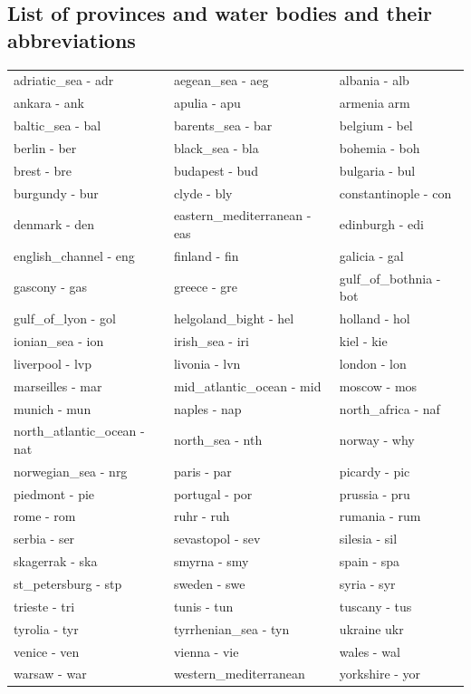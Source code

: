 \documentclass[11pt,a4paper]{report}
\begin{document}
\subsection*{List of provinces and water bodies and their abbreviations}
\begin{tabular}{ l | l | l }
adriatic\_sea - adr & aegean\_sea - aeg & albania - alb \\
ankara - ank & apulia - apu & armenia arm \\
baltic\_sea - bal & barents\_sea - bar & belgium - bel \\
berlin - ber & black\_sea - bla & bohemia - boh \\
brest - bre & budapest - bud & bulgaria - bul \\
burgundy - bur & clyde - bly & constantinople - con \\
denmark - den & eastern\_mediterranean - eas & edinburgh - edi \\
english\_channel - eng & finland - fin & galicia - gal \\
gascony - gas & greece - gre & gulf\_of\_bothnia - bot \\
gulf\_of\_lyon - gol & helgoland\_bight - hel & holland - hol \\
ionian\_sea - ion & irish\_sea - iri & kiel - kie \\
liverpool - lvp & livonia - lvn & london - lon \\
marseilles - mar & mid\_atlantic\_ocean - mid & moscow - mos \\
munich - mun & naples - nap & north\_africa - naf \\
north\_atlantic\_ocean - nat & north\_sea - nth & norway - why \\
norwegian\_sea - nrg & paris - par & picardy - pic \\
piedmont - pie & portugal - por & prussia - pru \\
rome - rom & ruhr - ruh & rumania - rum \\
serbia - ser & sevastopol - sev & silesia - sil \\
skagerrak - ska & smyrna - smy & spain - spa \\
st\_petersburg - stp & sweden - swe & syria - syr \\
trieste - tri & tunis - tun & tuscany - tus \\
tyrolia - tyr & tyrrhenian\_sea - tyn & ukraine ukr \\
venice - ven & vienna - vie & wales - wal \\
warsaw - war & western\_mediterranean & yorkshire - yor \\
\end{tabular}
\end{document}
